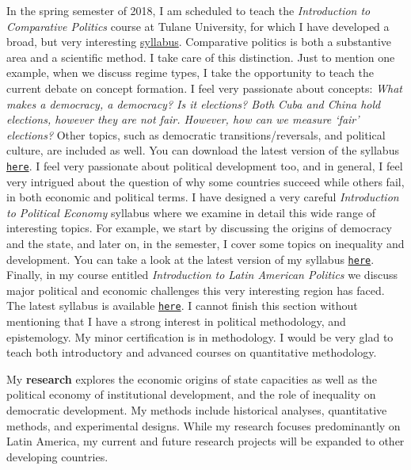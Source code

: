 \documentclass[10pt,stdletter,dateno,sigleft]{newlfm} %
\begin{document}
\begin{newlfm}
In the spring semester of 2018, I am scheduled to teach the \emph{Introduction to Comparative Politics} course at Tulane University, for which I have developed a broad, but very interesting \href{https://github.com/hbahamonde/Comparative_Politics_UGRAD/raw/master/Bahamonde_Comparative_Politics_Syllabus_UGRAD.pdf}{syllabus}. Comparative politics is both a substantive area and a scientific method. I take care of this distinction. Just to mention one example, when we discuss regime types, I take the opportunity to teach the current debate on concept formation. I feel very passionate about concepts: \emph{What makes a democracy, a \emph{democracy}? Is it elections? Both Cuba and China hold elections, however they are not fair. However, how can we measure `fair' elections?} Other topics, such as democratic transitions/reversals, and political culture, are included as well. You can download the latest version of the syllabus \href{https://github.com/hbahamonde/Comparative_Politics_UGRAD/raw/master/Bahamonde_Comparative_Politics_Syllabus_UGRAD.pdf}{\texttt{here}}. I feel very passionate about political development too, and in general, I feel very intrigued about the question of why some countries succeed while others fail, in both economic and political terms. I have designed a very careful \emph{Introduction to Political Economy} syllabus where we examine in detail this wide range of interesting topics. For example, we start by discussing the origins of democracy and the state, and later on, in the semester, I cover some topics on inequality and development. You can take a look at the latest version of my syllabus \href{https://github.com/hbahamonde/Political-Economy-Intro-UGrad/raw/master/Pol_Econ_Dev_Syllabus_UGRAD.pdf}{\texttt{here}}. Finally, in my course entitled \emph{Introduction to Latin American Politics} we discuss major political and economic challenges this very interesting region has faced. The latest syllabus is available \href{https://github.com/hbahamonde/Latin_American_Politics_UGRAD/raw/master/Bahamonde_Latin_American_Politics_Syllabus_UGRAD.pdf}{\texttt{here}}. I cannot finish this section without mentioning that I have a strong interest in political methodology, and epistemology. My minor certification is in methodology. I would be very glad to teach both introductory and advanced courses on quantitative methodology.


My {\bf research} explores the economic origins of state capacities as well as the political economy of institutional development, and the role of inequality on democratic development. My methods include historical analyses, quantitative methods, and experimental designs. While my research focuses predominantly on Latin America, my current and future research projects will be expanded to other developing countries.


\end{newlfm}
\end{document}
